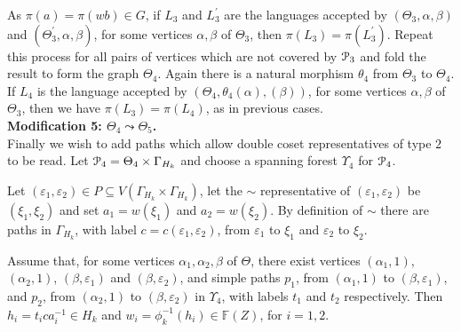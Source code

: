\documentclass[a4paper,12pt]{article}
\renewcommand{\a}{\alpha }
\renewcommand{\b}{\beta }
\newcommand{\G}{\Gamma }
\newcommand{\e}{\varepsilon }
\newcommand{\T}{\Theta }
\newcommand{\U}{\Upsilon }
\newcommand{\cP}{{\cal{P}}}
\numberwithin{equation}{section}
\numberwithin{figure}{section}
\newcommand{\FF}{\ensuremath{\mathbb{F}}}
\begin{document}
As $\pi(a)=\pi(wb)\in G$, if $L_3$ and $L_3^\prime$ are the languages
accepted by $(\T_3,\a,\b)$ and $(\T_3^\prime,\a,\b)$, for some
vertices $\a,\b$ of $\T_3$, then $\pi(L_3)=\pi(L_3^\prime)$.
Repeat this process for all pairs of  vertices which are not
covered by $\cP_3$  and fold
the result to form the graph $\T_4$. Again there is a natural
morphism $\theta_4$ from $\T_3$ to $\T_4$. If $L_4$ is the
language accepted by $(\T_4,\theta_4(\a),(\b))$, for some
vertices $\a,\b$ of $\Theta_3$, then
we have $\pi(L_3)=\pi(L_4)$, as in previous cases.\\[1em]


\noindent\textbf{Modification 5: $\T_4\leadsto \T_5$.}\\
Finally we wish to add paths which allow double coset representatives
of type $2$ to be read.
Let $\cP_4=\T_4\times \G_{H_k}$ and choose a spanning forest $\U_4$ for
$\cP_4$.

Let $(\e_1,\e_2)\in P\subseteq V(\G_{H_k}\times \G_{H_k})$, let 
 the $\sim$ representative of $(\e_1,\e_2)$ be $(\xi_1,\xi_2)$ and  
set $a_1=w(\xi_1)$ and $a_2=w(\xi_2)$.
By definition of $\sim$ there are  paths in $\G_{H_k}$,
with label
$c=c(\e_1,\e_2)$, from $\e_1$ to $\xi_1$ and $\e_2$ to $\xi_2$.

Assume that, for  some vertices $\a_1,\a_2, \b$ of $\T$, there exist vertices
$(\a_1,1)$, $(\a_2,1)$, $(\b,\e_1)$ and $(\b,\e_2)$, and simple 
paths   $p_1$, from $(\a_1,1)$ to $(\b,\e_1)$,
and $p_2$, from
$(\a_2,1)$ to $(\b,\e_2)$ in $\U_4$, with labels $t_1$  and  $t_2$ 
respectively.  Then 
 $h_i=
t_ica_i^{-1}\in H_k$ and $w_i=\phi_k^{-1}(h_i)\in \FF(Z)$, for $i=1,2$. 
\end{document}
